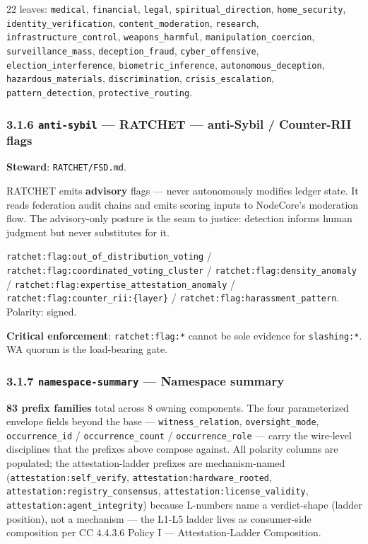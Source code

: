 \documentclass[11pt]{article}
\begin{document}
22 leaves: \texttt{medical}, \texttt{financial}, \texttt{legal}, \texttt{spiritual\_direction}, \texttt{home\_security}, \texttt{identity\_verification}, \texttt{content\_moderation}, \texttt{research}, \texttt{infrastructure\_control}, \texttt{weapons\_harmful}, \texttt{manipulation\_coercion}, \texttt{surveillance\_mass}, \texttt{deception\_fraud}, \texttt{cyber\_offensive}, \texttt{election\_interference}, \texttt{biometric\_inference}, \texttt{autonomous\_deception}, \texttt{hazardous\_materials}, \texttt{discrimination}, \texttt{crisis\_escalation}, \texttt{pattern\_detection}, \texttt{protective\_routing}.


\subsubsection*{3.1.6 \texttt{anti-sybil} — RATCHET — anti-Sybil / Counter-RII flags}


\textbf{Steward}: \texttt{RATCHET/FSD.md}.


RATCHET emits \textbf{advisory} flags — never autonomously modifies ledger state. It reads federation audit chains and emits scoring inputs to NodeCore's moderation flow. The advisory-only posture is the seam to justice: detection informs human judgment but never substitutes for it.


\texttt{ratchet:flag:out\_of\_distribution\_voting} / \texttt{ratchet:flag:coordinated\_voting\_cluster} / \texttt{ratchet:flag:density\_anomaly} / \texttt{ratchet:flag:expertise\_attestation\_anomaly} / \texttt{ratchet:flag:counter\_rii:\{layer\}} / \texttt{ratchet:flag:harassment\_pattern}. Polarity: signed.


\textbf{Critical enforcement}: \texttt{ratchet:flag:*} cannot be sole evidence for \texttt{slashing:*}. WA quorum is the load-bearing gate.


\subsubsection*{3.1.7 \texttt{namespace-summary} — Namespace summary}


\textbf{83 prefix families} total across 8 owning components. The four parameterized envelope fields beyond the base — \texttt{witness\_relation}, \texttt{oversight\_mode}, \texttt{occurrence\_id} / \texttt{occurrence\_count} / \texttt{occurrence\_role} — carry the wire-level disciplines that the prefixes above compose against. All polarity columns are populated; the attestation-ladder prefixes are mechanism-named (\texttt{attestation:self\_verify}, \texttt{attestation:hardware\_rooted}, \texttt{attestation:registry\_consensus}, \texttt{attestation:license\_validity}, \texttt{attestation:agent\_integrity}) because L-numbers name a verdict-shape (ladder position), not a mechanism — the L1-L5 ladder lives as consumer-side composition per CC 4.4.3.6 Policy I — Attestation-Ladder Composition.
\end{document}
